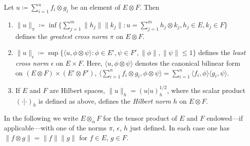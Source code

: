 Let $u \coloneq \sum_{i=1}^{n} f_{i} \otimes g_{i}$ be an element of\/ $E \otimes F$. 
Then
\begin{enumerate}[--,labelindent=.25em]

\item
$\|u\|_{\pi} \coloneq \inf\{\sum_{j=1}^{m} \|h_{j}\| \|k_{j}\| \colon u = \sum_{j=1}^{m}h_{j} \otimes k_{j}, h_{j} \in E, k_{j} \in F\}$ defines the \emph{greatest cross norm $\pi$} on $E \otimes F$.

\item
$\|u\|_{\epsilon} \coloneq \sup\{\langle u,\phi \otimes \psi\rangle \colon \phi \in E', \psi \in F', \|\phi\|, \|\psi\| \leq 1\}$ defines the 
\emph{least cross norm $\epsilon$} on $E \times F$. 
Here, $\langle u,\phi \otimes \psi\rangle$ denotes the canonical bilinear form on $(E \otimes F) \times (E' \otimes F')$, \ie $\langle\sum_{i=1}^{n} f_{i} \otimes g_{i},\phi \otimes \psi\rangle = \sum_{i=1}^{n} \langle f_{i},\phi\rangle\langle g_{i},\psi\rangle$.

\item
If\/ $E$ and $F$ are Hilbert spaces, $\|u\|_{h} = (u|u)_{h}^{1/2}$, where the scalar product $(\cdot|\cdot)_{h}$ is defined as above, defines the \emph{Hilbert norm $h$} on $E \otimes F$.
\end{enumerate}
In the following we write $E \otimes_{\alpha} F$ for the tensor product of\/ $E$ and $F$ endowed---if applicable---with one of the norms $\pi$, $\epsilon$, $h$ just defined.
In each case one has $\|f \otimes g\| = \|f\| \|g\|$ for $f \in E$, $g \in F$.

